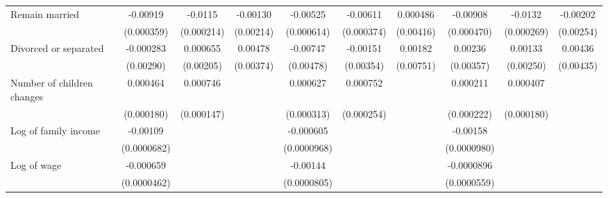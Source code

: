 {\begin{tabular}{l*{9}{c}}
\addlinespace
Remain married      &    -0.00919\sym{***}&     -0.0115\sym{***}&    -0.00130         &    -0.00525\sym{***}&    -0.00611\sym{***}&    0.000486         &    -0.00908\sym{***}&     -0.0132\sym{***}&    -0.00202         \\
                    &  (0.000359)         &  (0.000214)         &   (0.00214)         &  (0.000614)         &  (0.000374)         &   (0.00416)         &  (0.000470)         &  (0.000269)         &   (0.00254)         \\
\addlinespace
Divorced or separated&   -0.000283         &    0.000655         &     0.00478         &    -0.00747         &    -0.00151         &     0.00182         &     0.00236         &     0.00133         &     0.00436         \\
                    &   (0.00290)         &   (0.00205)         &   (0.00374)         &   (0.00478)         &   (0.00354)         &   (0.00751)         &   (0.00357)         &   (0.00250)         &   (0.00435)         \\
\addlinespace
Number of children changes&    0.000464\sym{**} &    0.000746\sym{***}&                     &    0.000627\sym{**} &    0.000752\sym{***}&                     &    0.000211         &    0.000407\sym{**} &                     \\
                    &  (0.000180)         &  (0.000147)         &                     &  (0.000313)         &  (0.000254)         &                     &  (0.000222)         &  (0.000180)         &                     \\
\addlinespace
Log of family income&    -0.00109\sym{***}&                     &                     &   -0.000605\sym{***}&                     &                     &    -0.00158\sym{***}&                     &                     \\
                    & (0.0000682)         &                     &                     & (0.0000968)         &                     &                     & (0.0000980)         &                     &                     \\
\addlinespace
Log of wage         &   -0.000659\sym{***}&                     &                     &    -0.00144\sym{***}&                     &                     &  -0.0000896         &                     &                     \\
                    & (0.0000462)         &                     &                     & (0.0000805)         &                     &                     & (0.0000559)         &                     &                     \\

\end{tabular}}
